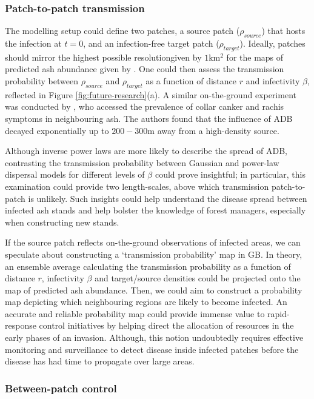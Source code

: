 \subsubsection{Patch-to-patch transmission}
The modelling setup could define two patches, a source patch ($\rho_{source}$) that hosts the infection at $t=0$, and an infection-free target patch ($\rho_{target}$). Ideally, patches should mirror the highest possible resolution\textemdash given by $1\mathrm{km^2}$ for the maps of predicted ash abundance given by \cite{hill.data}.
One could then assess the transmission probability between $\rho_{source}$ and $\rho_{target}$ as a function of distance $r$ and infectivity $\beta$, reflected in Figure \ref{fig:future-research}(a). 
A similar on-the-ground experiment was conducted by \cite{https://doi.org/10.1111/1365-2745.13383},
who accessed the prevalence of collar canker and rachis symptoms in neighbouring ash. 
The authors found that the influence of ADB decayed exponentially up to $200-300\mathrm{m}$ away from a high-density source.

Although inverse power laws are more likely to describe the spread of ADB, contrasting the transmission probability between Gaussian and power-law dispersal models for different levels of $\beta$ could prove insightful; in particular, this examination could provide two length-scales, above which transmission patch-to-patch is unlikely.  Such insights could help understand the disease spread between infected ash stands and help bolster the knowledge of forest managers, especially when constructing new stands.

If the source patch reflects on-the-ground observations of infected areas, we can speculate about constructing a `transmission probability' map in GB. In theory, an ensemble average calculating the transmission probability as a function of distance $r$, infectivity $\beta$ and target/source densities could be projected onto the map of predicted ash abundance.
Then, we could aim to construct a probability map depicting which neighbouring regions are likely to become infected. An accurate and reliable probability map could provide immense value to rapid-response control initiatives by helping direct the allocation of resources in the early phases of an invasion. 
Although, this notion undoubtedly requires effective monitoring and surveillance to detect disease inside infected patches before the disease has had time to propagate over large areas.

\subsubsection{Between-patch control}

